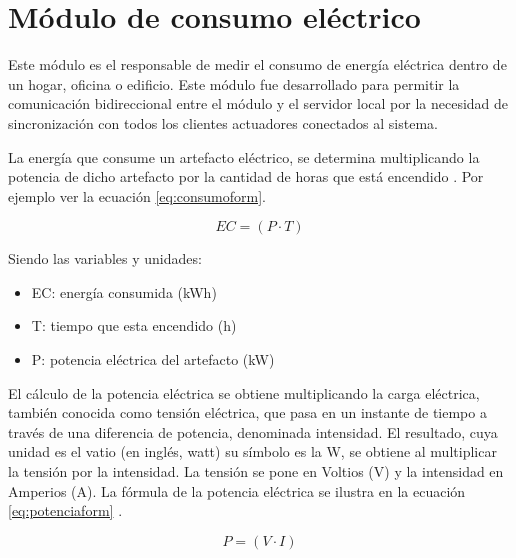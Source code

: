 
\section{Módulo de consumo eléctrico}

Este módulo es el responsable de medir el consumo de energía eléctrica dentro de un hogar, oficina o edificio. Este módulo fue desarrollado para permitir la comunicación bidireccional entre el módulo y el servidor local por la necesidad de sincronización con todos los clientes actuadores conectados al sistema.



La energía que consume un artefacto eléctrico, se determina multiplicando la potencia de dicho artefacto por la cantidad de horas que está encendido \citep{BOOK:3}. Por ejemplo ver la ecuación \ref{eq:consumoform}.

\begin{equation}
	\label{eq:consumoform}
	EC = \left( P \cdot T \right)
\end{equation}

\vspace{0.1cm}
Siendo las variables y unidades:
\begin{itemize}
\item EC: energía consumida (kWh)
\item T: tiempo que esta encendido (h)
\item P: potencia eléctrica del artefacto (kW)
\end{itemize}

\vspace{0.1cm}

El cálculo de la potencia eléctrica se obtiene multiplicando la carga eléctrica, también conocida como tensión eléctrica, que pasa en un instante de tiempo a través de una diferencia de potencia, denominada intensidad. El resultado, cuya unidad es el vatio (en inglés, watt) su símbolo es la W, se obtiene al multiplicar la tensión por la intensidad. La tensión se pone en Voltios (V) y la intensidad en Amperios (A). La fórmula de la potencia eléctrica se ilustra en la ecuación \ref{eq:potenciaform} \citep{WEBSITE:20}.

\begin{equation}
	\label{eq:potenciaform}
	P = \left( V \cdot I \right)
\end{equation}

